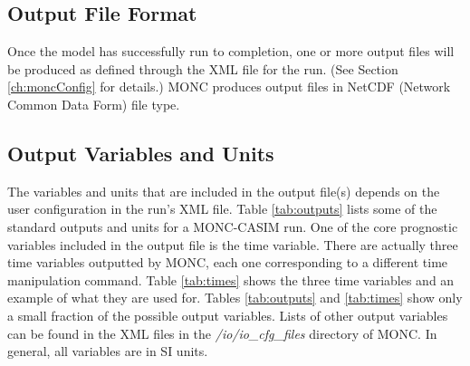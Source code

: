 \subsection{Output File Format}
Once the model has successfully run to completion, one or more output files will be produced as defined through the XML file for the run. (See Section \ref{ch:moncConfig} for details.) MONC produces output files in NetCDF (Network Common Data Form) file type.

\subsection{Output Variables and Units}
The variables and units that are included in the output file(s) depends on the user configuration in the run's XML file. Table \ref{tab:outputs} lists some of the standard outputs and units for a MONC-CASIM run. One of the core prognostic variables included in the output file is the time variable. There are actually three time variables outputted by MONC, each one corresponding to a different time manipulation command. Table \ref{tab:times} shows the three time variables and an example of what they are used for. Tables \ref{tab:outputs} and \ref{tab:times} show only a small fraction of the possible output variables. Lists of other output variables can be found in the XML files in the \textit{/io/io\_cfg\_files} directory of MONC. In general, all variables are in SI units. \citep{casimCode,moncCode}

